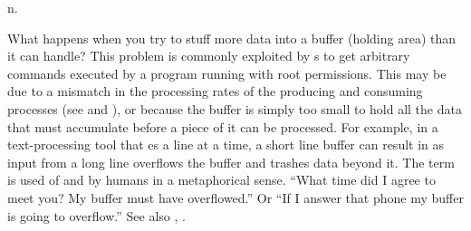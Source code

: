  n.

What happens when you try to stuff more data into a buffer (holding area) than
it can handle? This
problem is commonly exploited by s to get arbitrary commands
executed by a program running with root permissions. This may be due to a
mismatch in the processing rates of the producing and consuming processes (see
 and ), or because the buffer is
simply too small to hold all the data that must accumulate before a piece of it
can be processed. For example, in a text-processing tool that
es a line at a time, a short line buffer can result in
 as input from a long line overflows the buffer and trashes
data beyond it. The term is used of and by humans in a metaphorical sense.
``What time did I agree to meet you? My buffer must have overflowed.'' Or ``If I
answer that phone my buffer is going to overflow.'' See also ,
.

